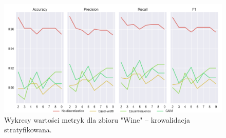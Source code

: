 \begin{figure}[H]
    \includegraphics[width=\textwidth]{img/cv_scores_stratifiedkfold/scoring_stratifiedkfold_wine.png}
    \caption{Wykresy wartości metryk dla zbioru "Wine" -- krowalidacja stratyfikowana.}
\end{figure}

